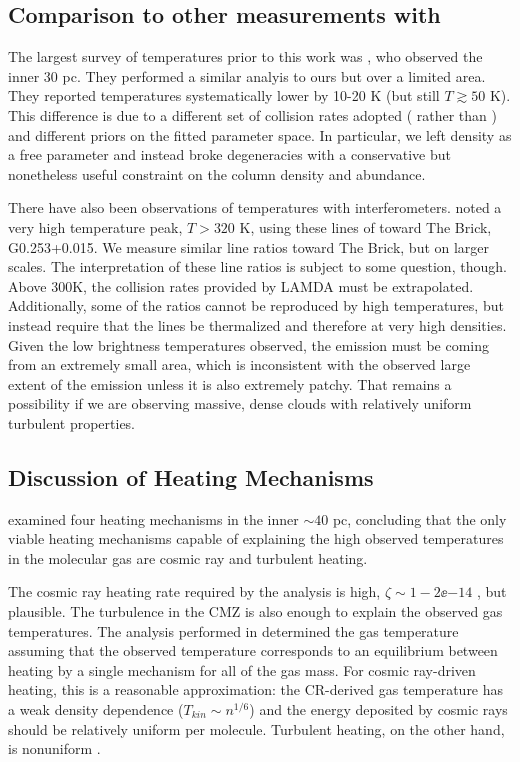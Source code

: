 \subsection{Comparison to other measurements with \para}
The largest survey of \para temperatures prior to this work was
\citet{Ao2013a}, who observed the inner 30 pc.  They performed a similar
analyis to ours but over a limited area.  They reported temperatures
systematically lower by 10-20 K (but still $T\gtrsim50$ K).  This difference is
due to a different set of collision rates adopted (\citet{Wiesenfeld2013a}
rather than \citet{Green1991a}) and different priors on the fitted parameter
space.  In particular, we left density as a free parameter and instead broke
degeneracies with a conservative but nonetheless useful constraint on the
column density and abundance.

There have also been observations of \para temperatures with interferometers.
\citet{Johnston2014a} noted a very high temperature peak, $T>320$ K, using these
lines of \para toward The Brick, G0.253+0.015.  We measure similar line
ratios toward The Brick, but on larger scales.  The interpretation of these
line ratios is subject to some question, though.  Above 300K, the collision
rates provided by LAMDA \citep{Green1991a,Schoier2005a,Wiesenfeld2013a} must be
extrapolated.  Additionally, some of the ratios cannot be reproduced by high
temperatures, but instead require that the lines be thermalized and therefore
at very high densities.   Given the low brightness temperatures observed,
the emission must be coming from an extremely small area, which is inconsistent
with the observed large extent of the emission unless it is also extremely
patchy.  That remains a possibility if we are observing massive, dense clouds
with relatively uniform turbulent properties.



\subsection{Discussion of Heating Mechanisms}
\citet{Ao2013a} examined four heating mechanisms in the inner $\sim 40$ pc,
concluding that the only viable heating mechanisms capable of explaining the
high observed temperatures in the molecular gas are cosmic ray and turbulent
heating.  

The cosmic ray heating rate required by the \citet{Ao2013a} analysis is high,
$\zeta\sim1-2\ee{-14}$ \pers, but plausible.  The turbulence in the CMZ is also
enough to explain the observed gas temperatures. 
The analysis performed in \citet{Ao2013a} determined the gas temperature
assuming that the observed temperature corresponds to an equilibrium between
heating by a single mechanism for all of the gas mass.  For cosmic ray-driven
heating, this is a reasonable approximation: the CR-derived gas temperature
has a weak density dependence ($T_{kin}\sim n^{1/6}$) and the energy deposited
by cosmic rays should be relatively uniform per molecule.  Turbulent heating,
on the other hand, is nonuniform \citep{Pan2009a}.

